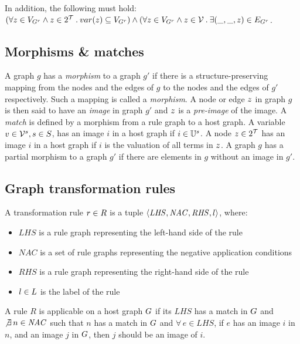 In addition, the following must hold: $(\forall z \in V_{G^r} \land z \in 2^{\mathcal{T}}\: .\: var(z) \subseteq V_{G^r}) \land (\forall z \in V_{G^r} \land z \in \mathcal{V}\: .\: \exists (\_, \_, z) \in E_{G^r}$.

\subsection{Morphisms \& matches}
A graph $g$ has a \textit{morphism} to a graph $g'$ if there is a structure-preserving mapping from the nodes and the edges of $g$ to the nodes and the edges of $g'$ respectively. Such a mapping is called a \textit{morphism}. A node or edge $z$ in graph $g$ is then said to have an \textit{image} in graph $g'$ and $z$ is a \textit{pre-image} of the image. A \textit{match} is defined by a morphism from a rule graph to a host graph. A variable $v \in \mathcal{V}^{s}, s \in S$, has an image $i$ in a host graph if $i \in \mathbb{U}^{s}$. A node $z \in 2^{\mathcal{T}}$ has an image $i$ in a host graph if $i$ is the valuation of all terms in $z$. A graph $g$ has a partial morphism to a graph $g'$ if there are elements in $g$ without an image in $g'$.

\subsection{Graph transformation rules}\label{sec:graph_rules}
\vspace{5px}
\begin{definition}
A transformation rule $r \in R$ is a tuple $\langle \mathit{LHS}, \mathit{NAC}, \mathit{RHS}, l \rangle$, where:
\begin{itemize}
  \item $\mathit{LHS}$ is a rule graph representing the left-hand side of the rule
  \item $\mathit{NAC}$ is a set of rule graphs representing the negative application conditions
  \item $\mathit{RHS}$ is a rule graph representing the right-hand side of the rule
  \item $l \in L$ is the label of the rule
\end{itemize}
\end{definition}

A rule $R$ is applicable on a host graph $G$ if its $\mathit{LHS}$ has a match in $G$ and $\not\exists\,n \in \mathit{NAC}$ such that $n$ has a match in $G$ and $\forall\,e \in \mathit{LHS}$, if $e$ has an image $i$ in $n$, and an image $j$ in $G$, then $j$ should be an image of $i$.

